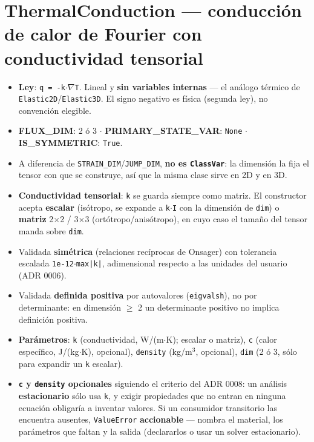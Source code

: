 \documentclass[11pt,letterpaper,oneside]{report}
\begin{document}
\section{ThermalConduction --- conducción de calor de Fourier con conductividad tensorial}

\begin{itemize}
  \item \textbf{Ley}: \texttt{q = -k\ensuremath{\cdot}\ensuremath{\nabla}T}. Lineal y \textbf{sin variables internas} --- el análogo térmico de \texttt{Elastic2D}/\texttt{Elastic3D}. El signo negativo es física (segunda ley), no convención elegible.
  \item \textbf{FLUX\_DIM}: 2 ó 3 \ensuremath{\cdot} \textbf{PRIMARY\_STATE\_VAR}: \texttt{None} \ensuremath{\cdot} \textbf{IS\_SYMMETRIC}: \texttt{True}.
  \item A diferencia de \texttt{STRAIN\_DIM}/\texttt{JUMP\_DIM}, \textbf{no es \texttt{ClassVar}}: la dimensión la fija el tensor con que se construye, así que la misma clase sirve en 2D y en 3D.
  \item \textbf{Conductividad tensorial}: \texttt{k} se guarda siempre como matriz. El constructor acepta \textbf{escalar} (isótropo, se expande a \texttt{k\ensuremath{\cdot}I} con la dimensión de \texttt{dim}) o \textbf{matriz} 2\ensuremath{\times}2 / 3\ensuremath{\times}3 (ortótropo/anisótropo), en cuyo caso el tamaño del tensor manda sobre \texttt{dim}.
  \item Validada \textbf{simétrica} (relaciones recíprocas de Onsager) con tolerancia escalada \texttt{1e-12\ensuremath{\cdot}max|k|}, adimensional respecto a las unidades del usuario (ADR 0006).
  \item Validada \textbf{definida positiva} por autovalores (\texttt{eigvalsh}), no por determinante: en dimensión \ensuremath{\ge} 2 un determinante positivo no implica definición positiva.
  \item \textbf{Parámetros}: \texttt{k} (conductividad, W/(m\ensuremath{\cdot}K); escalar o matriz), \texttt{c} (calor específico, J/(kg\ensuremath{\cdot}K), opcional), \texttt{density} (kg/m\ensuremath{^{3}}, opcional), \texttt{dim} (2 ó 3, sólo para expandir un \texttt{k} escalar).
  \item \textbf{\texttt{c} y \texttt{density} opcionales} siguiendo el criterio del ADR 0008: un análisis \textbf{estacionario} sólo usa \texttt{k}, y exigir propiedades que no entran en ninguna ecuación obligaría a inventar valores. Si un consumidor transitorio las encuentra ausentes, \texttt{ValueError} \textbf{accionable} --- nombra el material, los parámetros que faltan y la salida (declararlos o usar un solver estacionario).

\end{itemize}
\end{document}
